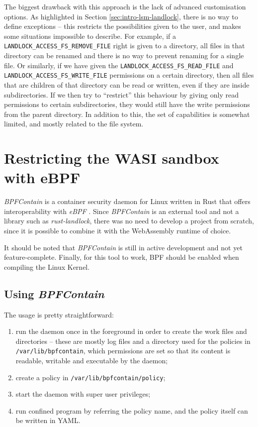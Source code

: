 The biggest drawback with this approach is the lack of advanced customisation options.
As highlighted in Section \ref{sec:intro-lsm-landlock},
there is no way to define exceptions -- this restricts the possibilities given to the user, and makes some situations
impossible to describe. For example, if a \texttt{LANDLOCK\_ACCESS\_FS\_REMOVE\_FILE} right is given to a directory,
all files in that directory can be renamed and there is no way to prevent renaming for a single file.
Or similarly, if we have given the \texttt{LANDLOCK\_ACCESS\_FS\_READ\_FILE} and \texttt{LANDLOCK\_ACCESS\_FS\_WRITE\_FILE}
permissions on a certain directory, then all files that are children of that directory can be read or written, even
if they are inside subdirectories. If we then try to ``restrict'' this behaviour by giving only read permissions to
certain subdirectories, they would still have the write permissions from the parent directory.
In addition to this, the set of capabilities is somewhat limited, and mostly related to the file system.

\clearpage
\section{Restricting the WASI sandbox with eBPF}
\label{sec:restricting-wasi-ebpf}

\textit{BPFContain} \cite{bpfcontain} is a container security daemon for Linux written in Rust that offers
interoperability with \textit{eBPF} \cite{ebpf}.
Since \textit{BPFContain} is an external tool and not a library such as \textit{rust-landlock}, there was no need
to develop a project from scratch, since it is possible to combine it with the WebAssembly runtime of choice.

It should be noted that \textit{BPFContain} is still in active development and not yet feature-complete.
Finally, for this tool to work, BPF should be enabled when compiling the Linux Kernel.

\subsection{Using \textit{BPFContain}}

The usage is pretty straightforward:
\begin{enumerate}
  \item run the daemon once in the foreground in order to create the work files and directories --
        these are mostly log files and a directory used for the policies in \texttt{/var/lib/bpfcontain},
        which permissions are set so that its content is readable, writable and executable by the daemon;
  \item create a policy in \texttt{/var/lib/bpfcontain/policy};
  \item start the daemon with super user privileges;
  \item run confined program by referring the policy name, and the policy itself can be written in YAML.
\end{enumerate}

